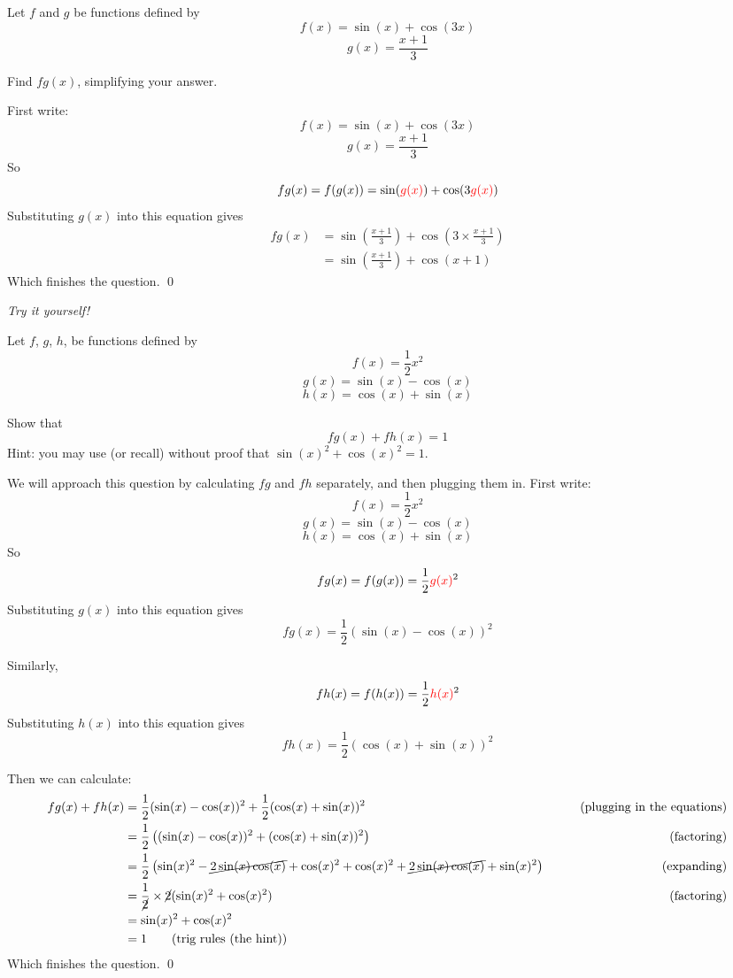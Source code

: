 \begin{example} \label{ex:simple-composition-different-functions}
    Let $f$ and $g$ be functions defined by 
    \[ f(x) = \sin (x) + \cos (3x) \]
    \[g(x) = \frac{x +1}{3}\]

    Find $fg(x)$, simplifying your answer.
\end{example}
\begin{solution}
    First write:
    \[ f(x) = \sin (x) + \cos (3x) \]
    \[g(x) = \frac{x +1}{3}\]
    So 
    \[ fg(x) = f(g(x)) = \sin (\textcolor{red}{g(x)}) + \cos (3\textcolor{red}{g(x)})\]
    Substituting $g(x)$ into this equation gives 
    \begin{align*} fg(x) &=  \sin \left(\frac{x +1}{3}\right) + \cos \left(3\times\frac{x +1}{3}\right) \\&= \sin \left(\frac{x +1}{3}\right) + \cos (x +1)
    \end{align*}
    Which finishes the question.
    \qed
\end{solution}
\begin{exercise} \label{ex:composition-three-functions}
    \emph{Try it yourself!}
    
    Let $f$, $g$, $h$, be functions defined by 
    \[ f(x) = \frac{1}{2}x^2\]
    \[g(x) = \sin(x) - \cos(x)\]
    \[h(x) = \cos(x) + \sin(x)\]

    Show that \[ fg(x) + fh(x) = 1\] 
    Hint: you may use (or recall) without proof that $\sin(x)^2 + \cos(x)^2 = 1$.
\end{exercise}
\begin{solution}
    We will approach this question by calculating $fg$ and $fh$ separately, and then plugging them in.
    First write:
    \[ f(x) = \frac{1}{2}x^2\]
    \[g(x) = \sin(x) - \cos(x)\]
    \[h(x) = \cos(x) + \sin(x)\]
    So 
    \[ fg(x) = f(g(x)) =\frac{1}{2}\textcolor{red}{g(x)}^2\]
    Substituting $g(x)$ into this equation gives 
    \[ fg(x) = \frac{1}{2}(\sin(x) - \cos(x))^2 \]

    Similarly, 
    \[ fh(x) = f(h(x)) = \frac{1}{2}\textcolor{red}{h(x)}^2 \]
    Substituting $h(x)$ into this equation gives
    \[ fh(x) = \frac{1}{2}(\cos(x) + \sin(x))^2 \]

    Then we can calculate:
    \begin{align*}
        fg(x) + fh(x) &= \frac{1}{2}(\sin(x) - \cos(x))^2 +  \frac{1}{2}(\cos(x) + \sin(x))^2 & \tag{plugging in the equations}\\
        &= \frac{1}{2}\left((\sin(x) - \cos(x))^2 + (\cos(x) + \sin(x))^2\right) & \tag{factoring}\\
        &= \frac{1}{2}\left( \sin(x)^2 - \cancel{2\sin(x)\cos(x)} + \cos(x)^2  + \cos(x)^2 + \cancel{2\sin(x)\cos(x)} + \sin(x)^2 \right) & \tag{expanding} \\
        &= \frac{1}{\cancel{2}} \times \cancel{2} (\sin(x)^2 + \cos(x)^2) & \tag{factoring} \\
        &= \sin(x)^2 + \cos(x)^2 \\
        &= 1 \tag{trig rules (the hint)}
    \end{align*}
    Which finishes the question.
    \qed
\end{solution}

